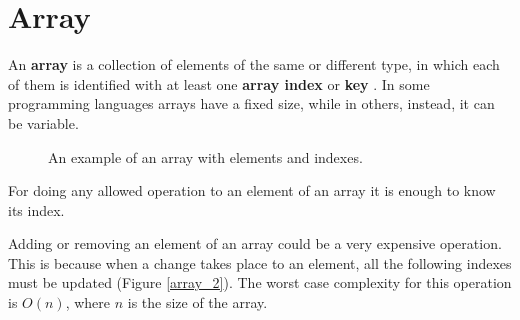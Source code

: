 \section{Array}
An \textbf{array} is a collection of elements of the same or different type, in which each of them is identified with at least one \textbf{array index} or \textbf{key} \cite{wikiarray}. In some programming languages arrays have a fixed size, while in others, instead, it can be variable.

\begin{figure}[H]
\centering
{}
\caption[An example of an array with elements and indexes.]{An example of an array with elements and indexes.}
\label{array_1}
\end{figure}

For doing any allowed operation to an element of an array it is enough to know its index. 

Adding or removing an element of an array could be a very expensive operation. This is because when a change takes place to an element, all the following indexes must be updated (Figure \ref{array_2}). The worst case complexity for this operation is \(O(n)\), where \(n\) is the size of the array.


